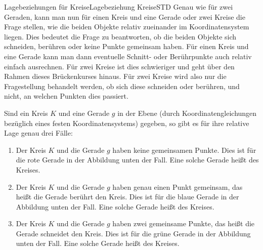 \begin{MXContent}{Lagebeziehungen für Kreise}{Lagebeziehung Kreise}{STD}
Genau wie für zwei Geraden, kann man nun für einen Kreis und eine Gerade oder zwei Kreise die Frage stellen, wie die beiden Objekte relativ zueinander im Koordinatensystem liegen. Dies bedeutet die Frage zu beantworten, ob die beiden Objekte sich schneiden, berühren oder keine Punkte gemeinsam haben. Für einen Kreis und eine Gerade kann man dann eventuelle Schnitt- oder Berührpunkte auch relativ einfach ausrechnen. Für zwei Kreise ist dies schwieriger und geht über den Rahmen dieses Brückenkurses hinaus. Für zwei Kreise wird also nur die Fragestellung behandelt werden, ob sich diese schneiden oder berühren, und nicht, an welchen Punkten dies passiert. 

\begin{MInfo}
Sind ein Kreis $K$ und eine Gerade $g$ in der Ebene (durch Koordinatengleichungen bezüglich eines festen Koordinatensystems) gegeben, so gibt es für ihre relative Lage genau drei Fälle:
\begin{enumerate}
 \item Der Kreis $K$ und die Gerade $g$ haben keine gemeinsamen Punkte. Dies ist für die rote Gerade in der Abbildung unten der Fall. Eine solche Gerade heißt  des Kreises.
 \item Der Kreis $K$ und die Gerade $g$ haben genau einen Punkt gemeinsam, das heißt die Gerade berührt den Kreis. Dies ist für die blaue Gerade in der Abbildung unten der Fall. Eine solche Gerade heißt  des Kreises.
 \item Der Kreis $K$ und die Gerade $g$ haben zwei gemeinsame Punkte, das heißt die Gerade schneidet den Kreis. Dies ist für die grüne Gerade in der Abbildung unten der Fall. Eine solche Gerade heißt  des Kreises.
\end{enumerate}
\begin{center}
\end{center} 
\end{MInfo}


\end{MXContent}
